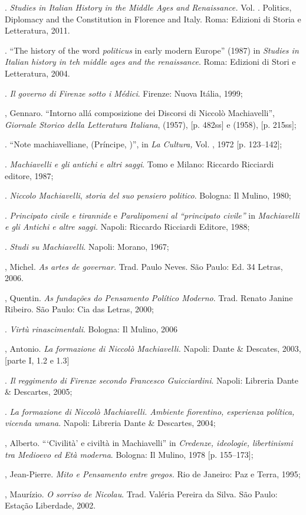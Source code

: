 \begin{bibliohedra}
\titidem. \emph{Studies in Italian History in the Middle Ages
and Renaissance.} Vol. . Politics, Diplomacy and the Constitution in
Florence and Italy. Roma: Edizioni di Storia e Letteratura, 2011.

\titidem. ``The history of the word \emph{politicus} in early
modern Europe'' (1987) in \emph{Studies in Italian history in teh middle
ages and the renaissance}. Roma: Edizioni di Stori e Letteratura, 2004.

\titidem. \emph{Il governo di Firenze sotto i Médici}.
Firenze: Nuova Itália, 1999;

, Gennaro. ``Intorno allá composizione dei Discorsi di Niccolò
Machiavelli'', \emph{Giornale Storico della Letteratura Italiana},
 (1957), {[}p. 482ss{]} e  (1958), {[}p. 215ss{]};

\titidem. ``Note machiavelliane,  (Príncipe, )'', in \emph{La
Cultura,} Vol. , 1972 {[}p. 123--142{]};

\titidem. \emph{Machiavelli e gli antichi} \emph{e altri saggi}.
Tomo  e  Milano: Riccardo Ricciardi editore, 1987;

\titidem. \emph{Niccolo Machiavelli}, \emph{storia del suo
pensiero politico}. Bologna: Il Mulino, 1980;

\titidem. \emph{Principato civile e tirannide} e
\emph{Paralipomeni al ``principato civile''} in \emph{Machiavelli e gli
Antichi e altre saggi.} Napoli: Riccardo Ricciardi Editore, 1988;

\titidem. \emph{Studi su Machiavelli}. Napoli: Morano, 1967;

, Michel. \emph{As artes de governar.} Trad. Paulo Neves. São
Paulo: Ed. 34 Letras, 2006.

, Quentin. \emph{As fundações do Pensamento Político Moderno}.
Trad. Renato Janine Ribeiro. São Paulo: Cia das Letras, 2000;

\titidem. \emph{Virtù rinascimentali}. Bologna: Il Mulino, 2006

, Antonio. \emph{La formazione di Niccolò Machiavelli.} Napoli: Dante \&
Descates, 2003, {[}parte I, 1.2 e 1.3{]}

\titidem. \emph{Il reggimento di Firenze secondo Francesco
Guicciardini}. Napoli: Libreria Dante \& Descartes, 2005;

\titidem. \emph{La formazione di Niccolò Machiavelli. Ambiente
fiorentino, esperienza política, vicenda umana}. Napoli: Libreria Dante
\& Descartes, 2004;

, Alberto. ```Civilità' e civiltà in Machiavelli'' in
\emph{Credenze, ideologie, libertinismi tra Medioevo ed Età moderna}.
Bologna: Il Mulino, 1978 {[}p. 155--173{]};

, Jean-Pierre. \emph{Mito e Pensamento entre gregos.} Rio de
Janeiro: Paz e Terra, 1995;

, Maurízio. \emph{O sorriso de Nicolau}. Trad. Valéria Pereira da
Silva. São Paulo: Estação Liberdade, 2002.
\end{bibliohedra}